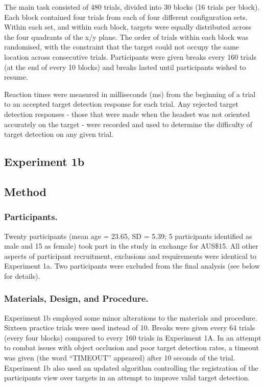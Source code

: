 \documentclass[
  man,floatsintext]{apa7}
\begin{document}
The main task consisted of 480 trials, divided into 30 blocks (16 trials per block). Each block contained four trials from each of four different configuration sets. Within each set, and within each block, targets were equally distributed across the four quadrants of the x/y plane. The order of trials within each block was randomised, with the constraint that the target could not occupy the same location across consecutive trials. Participants were given breaks every 160 trials (at the end of every 10 blocks) and breaks lasted until participants wished to resume.

Reaction times were measured in milliseconds (ms) from the beginning of a trial to an accepted target detection response for each trial. Any rejected target detection responses - those that were made when the headset was not oriented accurately on the target - were recorded and used to determine the difficulty of target detection on any given trial.

\hypertarget{experiment-1b}{%
\subsection{Experiment 1b}\label{experiment-1b}}

\hypertarget{method-1}{%
\subsection{Method}\label{method-1}}

\hypertarget{participants.-1}{%
\subsubsection{Participants.}\label{participants.-1}}

Twenty participants (mean age = 23.65, SD = 5.39; 5 participants identified as male and 15 as female) took part in the study in exchange for AUS\$15. All other aspects of participant recruitment, exclusions and requirements were identical to Experiment 1a. Two participants were excluded from the final analysis (see below for details).

\hypertarget{materials-design-and-procedure.}{%
\subsubsection{Materials, Design, and Procedure.}\label{materials-design-and-procedure.}}

Experiment 1b employed some minor alterations to the materials and procedure. Sixteen practice trials were used instead of 10. Breaks were given every 64 trials (every four blocks) compared to every 160 trials in Experiment 1A. In an attempt to combat issues with object occlusion and poor target detection rates, a timeout was given (the word ``TIMEOUT'' appeared) after 10 seconds of the trial. Experiment 1b also used an updated algorithm controlling the registration of the participants view over targets in an attempt to improve valid target detection.
\end{document}
